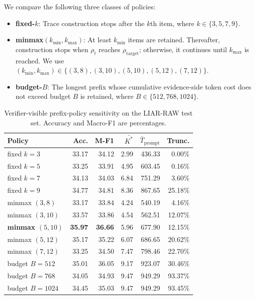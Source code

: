 \documentclass[letterpaper]{article}
\begin{document}
We compare the following three classes of policies:

\begin{itemize}
\item \textbf{fixed-$k$}: Trace construction stops after the $k$th item, where $k\in\{3,5,7,9\}$.
\item \textbf{minmax$(k_{\min},k_{\max})$}: At least $k_{\min}$ items are retained. Thereafter, construction stops when $\rho_t$ reaches $\rho_{\mathrm{target}}$; otherwise, it continues until $k_{\max}$ is reached. We use $(k_{\min},k_{\max})\in\{(3,8),(3,10),(5,10),(5,12),(7,12)\}$.
\item \textbf{budget-$B$}: The longest prefix whose cumulative evidence-side token cost does not exceed budget $B$ is retained, where $B\in\{512,768,1024\}$.
\end{itemize}

\begin{table}[b]
\centering
{\small
\setlength{\tabcolsep}{1.2pt}
\begin{tabularx}{\columnwidth}{@{}Y r r r r r@{}}
\toprule
\textbf{Policy} & \textbf{Acc.} & \textbf{M-F1} & \textbf{$\bar{K^\ast}$} & \textbf{$\bar{T}_{\mathrm{prompt}}$} & \textbf{Trunc.} \\
\midrule
fixed $k{=}3$ & 33.17 & 34.12 & 2.99 & 436.33 & 0.00\% \\
fixed $k{=}5$ & 33.25 & 33.91 & 4.95 & 603.45 & 0.16\% \\
fixed $k{=}7$ & 34.13 & 34.03 & 6.84 & 751.29 & 3.60\% \\
fixed $k{=}9$ & 34.77 & 34.81 & 8.36 & 867.65 & 25.18\% \\
minmax $(3,8)$ & 33.17 & 33.84 & 4.24 & 540.19 & 4.16\% \\
minmax $(3,10)$ & 33.57 & 33.86 & 4.54 & 562.51 & 12.07\% \\
\textbf{minmax $(5,10)$} & \textbf{35.97} & \textbf{36.66} & 5.96 & 677.90 & 12.15\% \\
minmax $(5,12)$ & 35.17 & 35.22 & 6.07 & 686.65 & 20.62\% \\
minmax $(7,12)$ & 33.25 & 34.50 & 7.47 & 798.46 & 22.70\% \\
budget $B{=}512$ & 35.01 & 36.05 & 9.17 & 923.07 & 30.46\% \\
budget $B{=}768$ & 34.05 & 34.93 & 9.47 & 949.29 & 93.37\% \\
budget $B{=}1024$ & 34.45 & 35.03 & 9.47 & 949.29 & 93.45\% \\
\bottomrule
\end{tabularx}
}
\caption{Verifier-visible prefix-policy sensitivity on the LIAR-RAW test set. Accuracy and Macro-F1 are percentages.}
\label{tab:prefix-policy}
\end{table}
\end{document}
